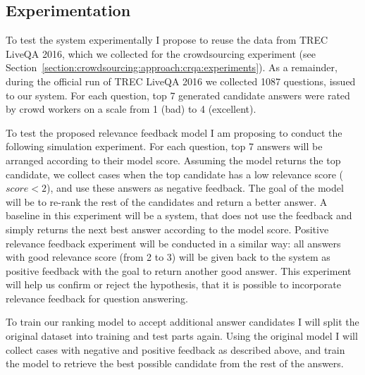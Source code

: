 \subsection{Experimentation}
\label{section:users:proposal:experiments}

To test the system experimentally I propose to reuse the data from TREC LiveQA 2016, which we collected for the crowdsourcing experiment (see Section~\ref{section:crowdsourcing:approach:crqa:experiments}).
As a remainder, during the official run of TREC LiveQA 2016 we collected 1087 questions, issued to our system.
For each question, top 7 generated candidate answers were rated by crowd workers on a scale from 1 (bad) to 4 (excellent).

To test the proposed relevance feedback model I am proposing to conduct the following simulation experiment.
For each question, top 7 answers will be arranged according to their model score.
Assuming the model returns the top candidate, we collect cases when the top candidate has a low relevance score (\eg $score < 2$), and use these answers as negative feedback.
The goal of the model will be to re-rank the rest of the candidates and return a better answer.
A baseline in this experiment will be a system, that does not use the feedback and simply returns the next best answer according to the model score.
Positive relevance feedback experiment will be conducted in a similar way: all answers with good relevance score (\eg from 2 to 3) will be given back to the system as positive feedback with the goal to return another good answer.
This experiment will help us confirm or reject the hypothesis, that it is possible to incorporate relevance feedback for question answering.

To train our ranking model to accept additional answer candidates I will split the original dataset into training and test parts again.
Using the original model I will collect cases with negative and positive feedback as described above, and train the model to retrieve the best possible candidate from the rest of the answers.

